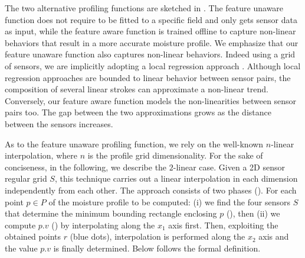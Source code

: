 The two alternative profiling functions are sketched in . 
The feature unaware function does not require to be fitted to a specific field and only gets sensor data as input, while the feature aware function is trained offline to capture non-linear behaviors that result in a more accurate moisture profile. 
We emphasize that our feature unaware function also captures non-linear behaviors.
Indeed using a grid of sensors, we are implicitly adopting a local regression approach \cite{loader2006local,cleveland1988locally}. Although local regression approaches are bounded to linear behavior between sensor pairs, the composition of several linear strokes can approximate a non-linear trend. Conversely, our feature aware function models the non-linearities between sensor pairs too.
The gap between the two approximations grows as the distance between the sensors increases.

As to the feature unaware profiling function, we rely on the well-known $n$-linear interpolation, where $n$ is the profile grid dimensionality.
For the sake of conciseness, in the following, we describe the $2$-linear case. 
Given a 2D sensor regular grid $S$, this technique carries out a linear interpolation in each dimension independently from each other.
The approach consists of two phases ().
For each point $p \in P$ of the moisture profile to be computed: (i) we find the four sensors $S$ that determine the minimum bounding rectangle enclosing $p$ (), then (ii) we compute $p.v$ () by interpolating along the $x_1$ axis first. Then, exploiting the obtained points $r$  (blue dots), interpolation is performed along the $x_2$ axis and the value $p.v$ is finally determined.
Below follows the formal definition.

